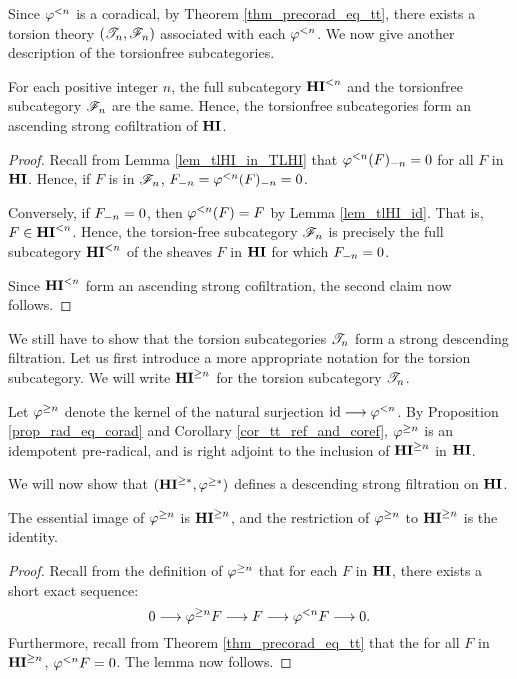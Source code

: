 Since $\tlHI{n}$ is a coradical, by Theorem \ref{thm_precorad_eq_tt},
there exists a torsion theory $(\Cat{T}_n, \Cat{F}_n)$ associated with
each $\tlHI{n}$. We now give another description of the torsionfree
subcategories.

\begin{prop}\label{prop_tsubcat_eq_tlHI}
  For each positive integer $n$, the full subcategory $\TFHI{n}$ and
  the torsionfree subcategory $\Cat{F}_n$ are the same. Hence, the
  torsionfree subcategories form an ascending strong cofiltration of
  $\HI$.
\end{prop}
\begin{proof}
Recall from Lemma \ref{lem_tlHI_in_TLHI} that 
$\RHI[n]{\tlHI{n}(F)} = 0$ for all $F$ in $\HI$. Hence, if $F$ is 
in $\Cat{F}_n$, $\RHI[n]{F} = \RHI[n]{\tlHI{n}(F)} = 0$.

Conversely, if $\RHI[n]{F} = 0$, then $\tlHI{n}(F) = F$ by Lemma
\ref{lem_tlHI_id}. That is, $F \in \TFHI{n}$. Hence, the
torsion-free subcategory $\Cat{F}_n$ is precisely the full 
subcategory $\TFHI{n}$ of the sheaves $F$ in $\HI$ for which 
$\RHI[n]{F} = 0$.

Since $\TFHI{n}$ form an ascending strong cofiltration, the second
claim now follows.
\end{proof}

We still have to show that the torsion subcategories $\Cat{T}_n$
form a strong descending filtration. Let us first introduce a more
appropriate notation for the torsion subcategory. We will write
$\THI{n}$ for the torsion subcategory $\Cat{T}_n$. 

\begin{defn}\label{def_upper_slice_functor}
Let $\tgHI{n}$ denote the kernel of the natural surjection $\id 
\to \tlHI{n}$. By Proposition \ref{prop_rad_eq_corad} and 
Corollary \ref{cor_tt_ref_and_coref}, $\tgHI{n}$ is an idempotent 
pre-radical, and is right adjoint to the inclusion of $\THI{n}$ in
$\HI$.
\end{defn}

We will now show that $(\THI{*}, \tgHI{*})$ defines a descending 
strong filtration on $\HI$.

\begin{lem}\label{lem_tgHI_reflection}
The essential image of $\tgHI{n}$ is $\THI{n}$, and the 
restriction of $\tgHI{n}$ to $\THI{n}$ is the identity.
\end{lem}
\begin{proof}
Recall from the definition of $\tgHI{n}$ that for each $F$
in $\HI$, there exists a short exact sequence:
\[
0 \to \tgHI{n} F \to F \to \tlHI{n} F \to 0.
\]
Furthermore, recall from Theorem \ref{thm_precorad_eq_tt} that
the for all $F$ in $\THI{n}$, $\tlHI{n} F = 0$. The lemma now
follows.
\end{proof}

